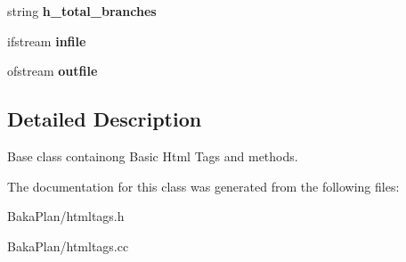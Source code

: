 \begin{DoxyCompactItemize}
\item 
\hypertarget{classHTMLTags_a71789f292e6d0dc11baa1e778bbb08c9}{string {\bfseries h\-\_\-total\-\_\-branches}}\label{classHTMLTags_a71789f292e6d0dc11baa1e778bbb08c9}

\item 
\hypertarget{classHTMLTags_ad72c63f88e720e8a23e457146d208578}{ifstream {\bfseries infile}}\label{classHTMLTags_ad72c63f88e720e8a23e457146d208578}

\item 
\hypertarget{classHTMLTags_a28fab1433a342a8862152c87959c03c3}{ofstream {\bfseries outfile}}\label{classHTMLTags_a28fab1433a342a8862152c87959c03c3}

\end{DoxyCompactItemize}


\subsection{Detailed Description}
Base class containong Basic Html Tags and methods. 

The documentation for this class was generated from the following files\-:\begin{DoxyCompactItemize}
\item 
Baka\-Plan/htmltags.\-h\item 
Baka\-Plan/htmltags.\-cc\end{DoxyCompactItemize}
